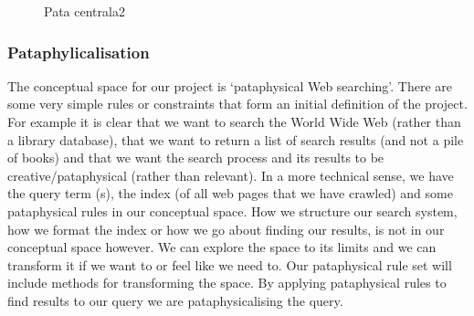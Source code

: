 

\begin{figure}[!htbp] %
  \centering
  
\caption[Pata centrala2]{Pata centrala2}
\label{fig:patasearch02}
\end{figure}


\subsubsection{Pataphylicalisation}


The conceptual space for our project is `pataphysical Web searching'. There are some very simple rules or constraints that form an initial definition of the project. For example it is clear that we want to search the World Wide Web (rather than a library database), that we want to return a list of search results (and not a pile of books) and that we want the search process and its results to be creative/pataphysical (rather than relevant).  In a more technical sense, we have the query term (s), the index (of all web pages that we have crawled) and some pataphysical rules in our conceptual space. How we structure our search system, how we format the index or how we go about finding our results, is not in our conceptual space however. We can explore the space to its limits and we can transform it if we want to or feel like we need to. Our pataphysical rule set will include methods for transforming the space. By applying pataphysical rules to find results to our query we are pataphysicalising the query.

